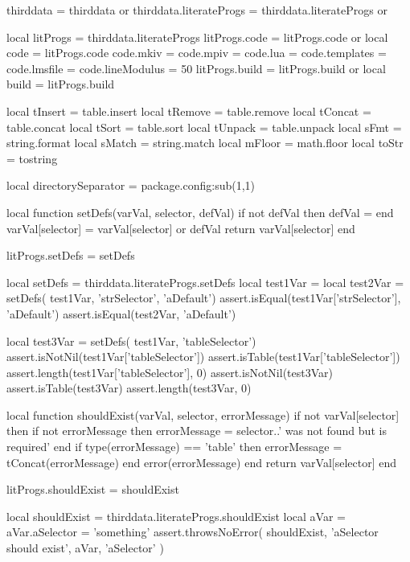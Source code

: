 thirddata               = thirddata               or {}
thirddata.literateProgs = thirddata.literateProgs or {}

local litProgs   = thirddata.literateProgs
litProgs.code    = litProgs.code or {}
local code       = litProgs.code
code.mkiv        = {}
code.mpiv        = {}
code.lua         = {}
code.templates   = {}
code.lmsfile     = {}
code.lineModulus = 50
litProgs.build   = litProgs.build or {}
local build      = litProgs.build

local tInsert = table.insert
local tRemove = table.remove
local tConcat = table.concat
local tSort   = table.sort
local tUnpack = table.unpack
local sFmt    = string.format
local sMatch  = string.match
local mFloor  = math.floor
local toStr   = tostring

local directorySeparator = package.config:sub(1,1)
\stopLuaCode

\startTestSuite[setDefs]

\startLuaCode
local function setDefs(varVal, selector, defVal)
  if not defVal then defVal = { } end
  varVal[selector] = varVal[selector] or defVal
  return varVal[selector]
end

litProgs.setDefs = setDefs
\stopLuaCode

\startLuaTest
  local setDefs = thirddata.literateProgs.setDefs
  local test1Var = { }
  local test2Var = setDefs( test1Var, 'strSelector', 'aDefault')
  assert.isEqual(test1Var['strSelector'], 'aDefault')
  assert.isEqual(test2Var, 'aDefault')

  local test3Var = setDefs( test1Var, 'tableSelector')
  assert.isNotNil(test1Var['tableSelector'])
  assert.isTable(test1Var['tableSelector'])
  assert.length(test1Var['tableSelector'], 0)
  assert.isNotNil(test3Var)
  assert.isTable(test3Var)
  assert.length(test3Var, 0)
\stopLuaTest
\stopTestCase
\stopTestSuite

\startTestSuite[shouldExist]

\startLuaCode
local function shouldExist(varVal, selector, errorMessage)
  if not varVal[selector] then
    if not errorMessage then
      errorMessage = selector..' was not found but is required'
    end
    if type(errorMessage) == 'table' then
      errorMessage = tConcat(errorMessage)
    end
    error(errorMessage)
  end
  return varVal[selector]
end

litProgs.shouldExist = shouldExist

\stopLuaCode

\startLuaTest
  local shouldExist = thirddata.literateProgs.shouldExist
  local aVar = { }
  aVar.aSelector = 'something'
  assert.throwsNoError(
    shouldExist,
    'aSelector should exist',
    aVar,
    'aSelector'
  )
\stopLuaTest
\stopTestCase

